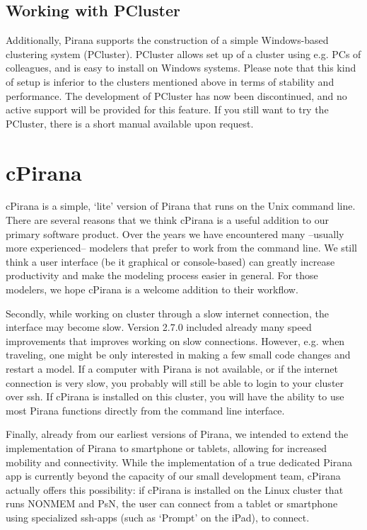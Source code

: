 {{{{\section{Working with PCluster}
Additionally, Pirana supports the construction of a simple
Windows-based clustering system (PCluster). PCluster allows set up of a cluster using
e.g. PCs of colleagues, and is easy to install on Windows systems.
Please note that this kind of setup is inferior to the clusters
mentioned above in terms of stability and performance. The development of PCluster has now been
discontinued, and no active support will be provided for this
feature. If you still want to try the PCluster, there is a short
manual available upon request.




\chapter{cPirana}
cPirana is a simple, `lite' version of Pirana that runs on the Unix command line. 
There are several reasons that we think cPirana is a useful addition to our primary software product. 
Over the years we have encountered many --usually more experienced--
modelers that prefer to work from the command line. We still think a user interface (be it graphical or
console-based) can greatly increase productivity and make the modeling process
easier in general. For those modelers, we hope cPirana is a welcome addition to their workflow. 

\vspace{10pt}

\noindent Secondly, while working on cluster through a slow internet connection, the interface may become slow. 
Version 2.7.0 included already many speed improvements that improves working on slow connections. However, 
e.g. when traveling, one might be only interested in making a few small code changes and restart a model.
If a computer with Pirana is not available, or if the internet connection is very slow, you probably will still 
be able to login to your cluster over ssh. If cPirana is installed on this cluster, you will have the ability to
use most Pirana functions directly from the command line interface.

\vspace{10pt}

\noindent Finally, already from our earliest versions of Pirana, we intended to extend the implementation
of Pirana to smartphone or tablets, allowing for increased mobility
and connectivity. While the implementation of a true dedicated Pirana
app is currently beyond the capacity of our small development team, cPirana
actually offers this possibility: if cPirana is installed on the Linux
cluster that runs NONMEM and PsN, the user can connect from a tablet
or smartphone using specialized ssh-apps (such as `Prompt' on the
iPad), to connect. 

}}}}
